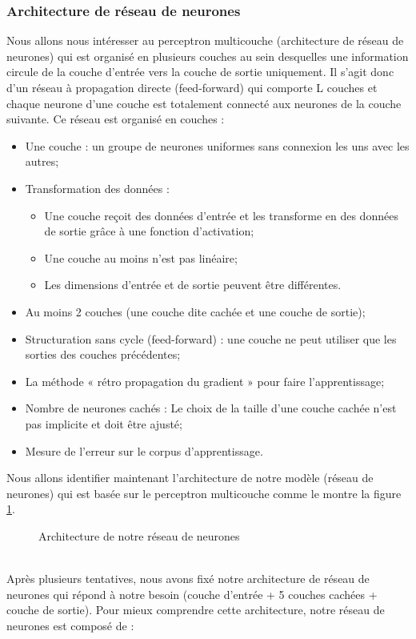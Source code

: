 \subsubsection{Architecture de réseau de neurones}
Nous allons nous intéresser au perceptron multicouche (architecture de réseau de neurones) qui est organisé en plusieurs couches au sein desquelles une information circule de la couche d'entrée vers la couche de sortie uniquement. Il s'agit donc d'un réseau à propagation directe (feed-forward) qui comporte L couches et chaque neurone d'une couche est totalement connecté aux neurones de la couche suivante.
Ce réseau est organisé en couches \cite{perceptronmulticouches}:
\begin{itemize}
    \item Une couche : un groupe de neurones uniformes sans connexion les uns avec les autres;
    \item Transformation des données : 
        \begin{itemize}[label=\textbullet]
        \item Une couche reçoit des données d’entrée et les transforme en des données de sortie grâce à une fonction d'activation;
         \item Une couche au moins n’est pas linéaire;
         \item Les dimensions d’entrée et de sortie peuvent être différentes.
    \end{itemize}
    
   \item Au moins 2 couches (une couche dite cachée et une couche de sortie);
   \item Structuration sans cycle (feed-forward) : une couche ne peut utiliser que les sorties des couches précédentes;
   \item La méthode « rétro propagation du gradient » pour faire l’apprentissage;
   \item Nombre de neurones cachés : Le choix de la taille d’une couche cachée n'est pas implicite et doit être ajusté;
   \item Mesure de l’erreur sur le corpus d'apprentissage.
\end{itemize}
\newpage

Nous allons identifier maintenant l'architecture de notre modèle (réseau de neurones) qui est basée sur le perceptron multicouche comme le montre la figure \ref{fig:deeplearning}.
   \begin{figure}[htpb]
    \centering
    \caption{Architecture de notre réseau de neurones}
    \label{fig:deeplearning}
    \end{figure}
    \\
Après plusieurs tentatives, nous avons fixé notre architecture de réseau de neurones qui répond à notre besoin (couche d’entrée + 5 couches cachées + couche de sortie).
Pour mieux comprendre cette architecture, notre réseau de neurones est composé de : 

